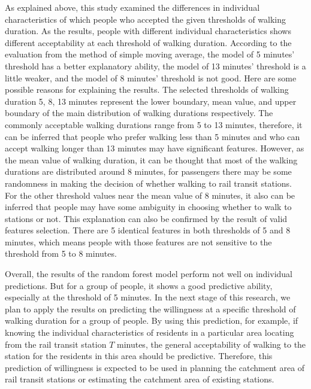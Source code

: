 %
As explained above, this study examined the differences in individual characteristics of which people who accepted the given thresholds of walking duration. As the results, people with different individual characteristics shows different acceptability at each threshold of walking duration. According to the evaluation from the method of simple moving average, the model of 5 minutes’ threshold has a better explanatory ability, the model of 13 minutes' threshold is a little weaker, and the model of 8 minutes' threshold is not good. Here are some possible reasons for explaining the results. The selected thresholds of walking duration 5, 8, 13 minutes represent the lower boundary, mean value, and upper boundary of the main distribution of walking durations respectively. The commonly acceptable walking durations range from 5 to 13 minutes, therefore, it can be inferred that people who prefer walking less than 5 minutes and who can accept walking longer than 13 minutes may have significant features. However, as the mean value of walking duration, it can be thought that most of the walking durations are distributed around 8 minutes, for passengers there may be some randomness in making the decision of whether walking to rail transit stations. For the other threshold values near the mean value of 8 minutes, it also can be inferred that people may have some ambiguity in choosing whether to walk to stations or not. This explanation can also be confirmed by the result of valid features selection. There are 5 identical features in both thresholds of 5 and 8 minutes, which means people with those features are not sensitive to the threshold from 5 to 8 minutes.

%
Overall, the results of the random forest model perform not well on individual predictions. But for a group of people, it shows a good predictive ability, especially at the threshold of 5 minutes. In the next stage of this research, we plan to apply the results on predicting the willingness at a specific threshold of walking duration for a group of people. By using this prediction, for example, if knowing the individual characteristics of residents in a particular area locating from the rail transit station $T$ minutes, the general acceptability of walking to the station for the residents in this area should be predictive. Therefore, this prediction of willingness is expected to be used in planning the catchment area of rail transit stations or estimating the catchment area of existing stations.


